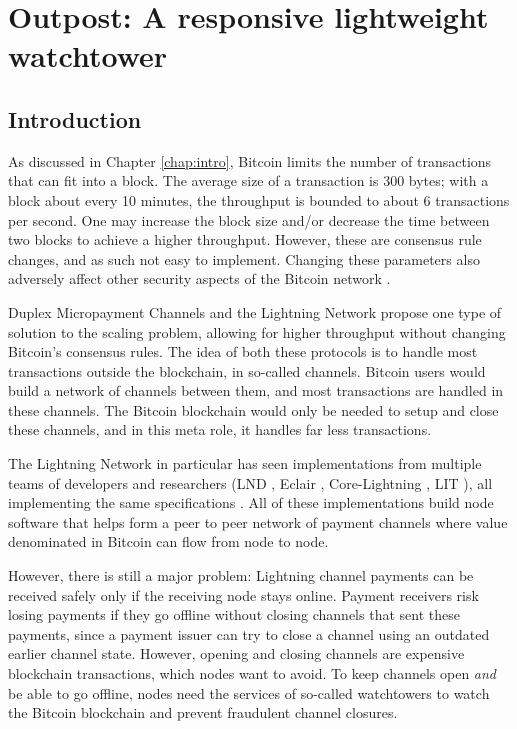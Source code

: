 \chapter{Outpost: A responsive lightweight watchtower}  %
\label{chapter:outpost}

\section{Introduction}
As discussed in Chapter \ref{chap:intro},  Bitcoin limits the number of transactions that can fit into a block. The average size of a transaction is 300 bytes; with a block about every 10 minutes, the throughput is bounded to about 6 transactions per second. One may increase the block size and/or decrease the time between two blocks to achieve a higher throughput. However, these are consensus rule changes, and as such not easy to implement. Changing these parameters also adversely affect other security aspects of the Bitcoin network \cite{gervais2016security}.

Duplex Micropayment Channels \cite{decker_wattenhofer} and the Lightning Network \cite{poon_dryja} propose one type of solution to the scaling problem, allowing for higher throughput without changing Bitcoin's consensus rules. The idea of both these protocols is to handle most transactions outside the blockchain, in so-called channels. Bitcoin users would build a network of channels between them, and most transactions are handled in these channels. The Bitcoin blockchain would only be needed to setup and close these channels, and in this meta role, it handles far less transactions. 

The Lightning Network in particular has seen implementations from multiple teams of developers and researchers (LND \cite{lnd}, Eclair \cite{eclair}, Core-Lightning \cite{c_lightning}, LIT \cite{lit}), all implementing the same specifications \cite{bolt}. All of these implementations build node software that helps form a peer to peer network of payment channels where value denominated in Bitcoin can flow from node to node. 

However, there is still a major problem: Lightning channel payments can be received safely only if the receiving node stays online. Payment receivers risk losing payments if they go offline without closing channels that sent these payments, since a payment issuer can try to close a channel using an outdated earlier channel state. However, opening and closing channels are expensive blockchain transactions, which nodes want to avoid. To keep channels open \textit{and} be able to go offline, nodes need the services of so-called watchtowers \cite{watchtowers} to watch the Bitcoin blockchain and prevent fraudulent channel closures.

